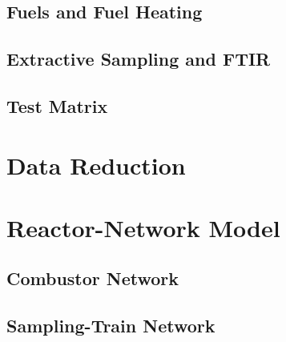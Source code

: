 \documentclass[balance,colorlinks]{asmeconf}
\begin{document}
\subsection{Fuels and Fuel Heating}
\subsection{Extractive Sampling and FTIR}
\subsection{Test Matrix}

\section{Data Reduction}

\section{Reactor-Network Model}
\subsection{Combustor Network}
\subsection{Sampling-Train Network}
\end{document}
